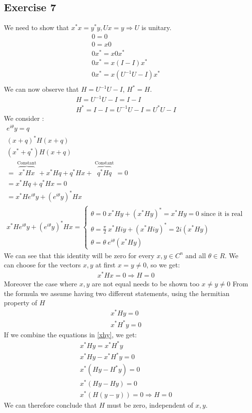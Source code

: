 \subsection{Exercise 7}
We need to show that $x^*x = y^*y, Ux = y \Rightarrow U $ is unitary.
\begin{gather*}
0 = 0 \\
0 = x 0 \\
0 x^*= x 0 x^*\\
0 x^*= x (I-I) x^*\\
0 x^*= x (U^{-1}U -I) x^*\\
\end{gather*}
We can now observe that $H = U^{-1}U -I$, $H^* = H$.
\begin{gather*}
H = U^{-1}U -I = I - I \\
H^* = I - I = U^{-1}U - I = U^{*}U - I
\end{gather*}
We consider :
\begin{gather*}
e^{i \theta} y = q\\
\left( x+q \right)^* H \left(x + q\right) \\
\left( x^*+q^* \right)H \left( x+q \right) \\
= \overbrace{x^*Hx}^{\text{ Constant }} + x^*Hq + q^*Hx + \overbrace{q^*Hq}^{\text{ Constant }} = 0\\
= x^*Hq + q^*Hx = 0\\
= x^*H e^{i \theta} y + \left(e^{i \theta} y\right)^* H x\\
x^*H e^{i \theta} y + \left(e^{i \theta} y\right)^* H x =
\begin{cases}
\theta = 0 ~ x^*Hy + (x^*Hy)^* = x^*Hy = 0 \text{ since it is real }  \\
\theta = \frac{\pi}{2}  ~ x^*H i y + (x^*H i y )^* =  2i \left( x^*Hy \right)\\
\theta = \theta ~ e^{i \theta} \left ( x^* H y \right) 
\end{cases}
\end{gather*}
We can see that this identity will be zero for every $x,y \in C^n$ and all $\theta \in R$.
We can choose for the vectors $x,y$ at first $x = y \neq 0$, so we get:
\begin{gather*}
x^*Hx = 0 \Rightarrow H = 0
\end{gather*}
Moreover the case where $x,y$ are not equal needs to be shown too $ x \neq y \neq 0$
From the formula we assume having two different statements, using the hermitian property of $H$
\begin{gather}
\label{xhy}
x^*Hy = 0 \\
x^*H^* y =0
\end{gather}
If we combine the equations in \ref{xhy}, we get:
\begin{gather*}
x^*Hy = x^*H^* y \\
x^*Hy - x^*H^* y = 0\\
x^* \left( Hy - H^*y \right) = 0\\
x^* \left( Hy - Hy \right) = 0\\
x^* \left( H \left( y- y \right) \right) = 0 \Rightarrow H = 0
\end{gather*}
We can therefore conclude that $H$ must be zero, independent of $x,y$.
